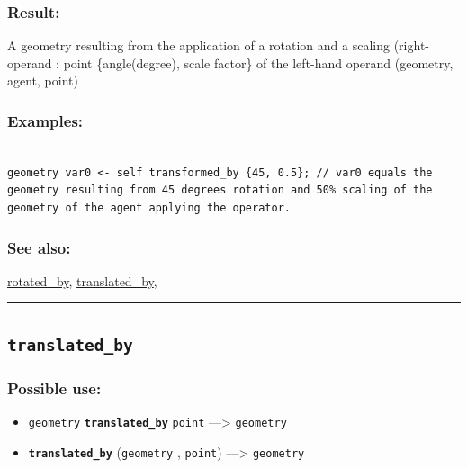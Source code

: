 \documentclass[]{book}
\providecommand{\tightlist}{%
  \setlength{\itemsep}{0pt}\setlength{\parskip}{0pt}}
\theoremstyle{definition}
\theoremstyle{definition}
\theoremstyle{definition}
\theoremstyle{remark}
\begin{document}
\subsubsection{Result:}\label{result-512}

A geometry resulting from the application of a rotation and a scaling
(right-operand : point \{angle(degree), scale factor\} of the left-hand
operand (geometry, agent, point)

\subsubsection{Examples:}\label{examples-367}

\begin{verbatim}
 
geometry var0 <- self transformed_by {45, 0.5}; // var0 equals the geometry resulting from 45 degrees rotation and 50% scaling of the geometry of the agent applying the operator.
\end{verbatim}

\subsubsection{See also:}\label{see-also-209}

\href{operators-n-to-r.html\#rotated_by}{rotated\_by},
\href{operators-s-to-z.html\#translated_by}{translated\_by},

\begin{center}\rule{0.5\linewidth}{\linethickness}\end{center}

\subsection{\texorpdfstring{\texttt{translated\_by}}{translated\_by}}\label{translated_by}

\subsubsection{Possible use:}\label{possible-use-531}

\begin{itemize}
\tightlist
\item
  \texttt{geometry} \textbf{\texttt{translated\_by}} \texttt{point}
  ---\textgreater{} \texttt{geometry}
\item
  \textbf{\texttt{translated\_by}} (\texttt{geometry} , \texttt{point})
  ---\textgreater{} \texttt{geometry}
\end{itemize}
\end{document}
